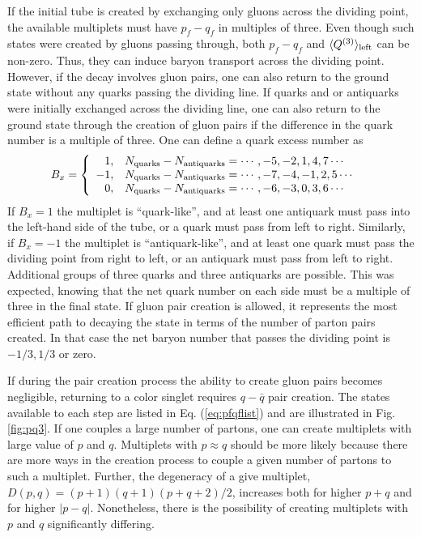 \documentclass[aps, prc, 12pt, nofootinbib, showpacs, superscriptaddress, tightenlines, groupedaddress]{revtex4-2}
\begin{document}
If the initial tube is created by exchanging only gluons across the dividing point, the available multiplets must have $p_f-q_f$ in multiples of three. Even though such states were created by gluons passing through, both $p_f-q_f$ and $\langle Q^{(3)}\rangle_{\rm left}$ can be non-zero. Thus, they can induce baryon transport across the dividing point. However, if the decay involves gluon pairs, one can also return to the ground state without any quarks passing the dividing line. If quarks and or antiquarks were initially exchanged across the dividing line, one can also return to the ground state through the creation of gluon pairs if the difference in the quark number is a multiple of three. One can define a quark excess number as
\begin{eqnarray}
B_x&=\left\{\begin{array}{rl}
1,&N_{\rm quarks}-N_{\rm antiquarks}=\cdots,-5,-2,1,4,7\cdots\\
-1,&N_{\rm quarks}-N_{\rm antiquarks}=\cdots,-7,-4,-1,2,5\cdots\\
0, &N_{\rm quarks}-N_{\rm antiquarks}=\cdots,-6,-3,0,3,6\cdots
\end{array}\right.
\end{eqnarray}
If $B_x=1$ the multiplet is ``quark-like'', and at least one antiquark must pass into the left-hand side of the tube, or a quark must pass from left to right. Similarly, if $B_x=-1$ the multiplet is ``antiquark-like'', and at least one quark must pass the dividing point from right to left, or an antiquark must pass from left to right. Additional groups of three quarks and three antiquarks are possible. This was expected, knowing that the net quark number on each side must be a multiple of three in the final state. If gluon pair creation is allowed, it represents the most efficient path to decaying the state in terms of the number of parton pairs created. In that case the net baryon number that passes the dividing point is $-1/3,1/3$ or zero.

If during the pair creation process the ability to create gluon pairs becomes negligible, returning to a color singlet requires $q-\bar{q}$ pair creation. The states available to each step are listed in Eq. (\ref{eq:pfqflist}) and are illustrated in Fig. \ref{fig:pq3}. If one couples a large number of partons, one can create multiplets with large value of $p$ and $q$. Multiplets with $p\approx q$ should be more likely because there are more ways in the creation process to couple a given number of partons to such a multiplet. Further, the degeneracy of a give multiplet, $D(p,q)=(p+1)(q+1)(p+q+2)/2$, increases both for higher $p+q$ and for higher $|p-q|$. Nonetheless, there is the possibility of creating multiplets with $p$ and $q$ significantly differing.
\end{document}
